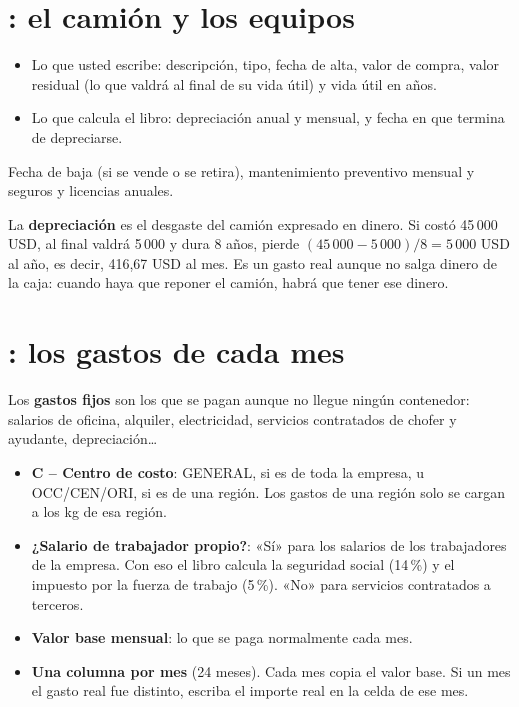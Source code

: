 \section{: el camión y los equipos}

\begin{itemize}
  \item {} Lo que usted escribe: descripción, tipo, fecha de alta, valor de compra, valor residual (lo que valdrá al final de su vida
        útil) y vida útil en años.
  \item {} Lo que calcula el libro: depreciación anual y mensual, y fecha en que termina de depreciarse.
\end{itemize}

 Fecha de baja (si se vende o se retira), mantenimiento preventivo mensual y seguros y licencias anuales.

\begin{nota}
La \textbf{depreciación} es el desgaste del camión expresado en dinero. Si costó 45\,000 USD, al final valdrá 5\,000 y dura 8 años,
pierde $(45\,000-5\,000)/8 = 5\,000$ USD al año, es decir, 416,67 USD al mes. Es un gasto real aunque no salga dinero de la caja:
cuando haya que reponer el camión, habrá que tener ese dinero.
\end{nota}

\section{: los gastos de cada mes}

Los \textbf{gastos fijos} son los que se pagan aunque no llegue ningún contenedor: salarios de oficina, alquiler, electricidad,
servicios contratados de chofer y ayudante, depreciación\dots

\begin{itemize}
  \item \textbf{C – Centro de costo}: GENERAL, si es de toda la empresa, u OCC/CEN/ORI, si es de una región.
        Los gastos de una región solo se cargan a los kg de esa región.
  \item {} \textbf{¿Salario de trabajador propio?}: «Sí» para los salarios de los trabajadores de la empresa. Con eso el libro calcula
        la seguridad social (14\,\%) y el impuesto por la fuerza de trabajo (5\,\%). «No» para servicios contratados a terceros.
  \item {} \textbf{Valor base mensual}: lo que se paga normalmente cada mes.
  \item {} \textbf{Una columna por mes} (24 meses). Cada mes copia el valor base. Si un mes el gasto real fue distinto, escriba el
        importe real en la celda de ese mes.
\end{itemize}

